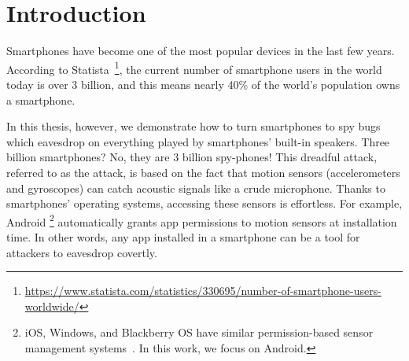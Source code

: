 \section{Introduction}\label{sec:intro}

Smartphones have become one of the most popular devices in the last few years. According to Statista~\footnote{\url{https://www.statista.com/statistics/330695/number-of-smartphone-users-worldwide/}}, the current number of smartphone users in the world today is over 3 billion, and this means nearly 40\% of the world’s population owns a smartphone. 

In this thesis, however, we demonstrate how to turn smartphones to spy bugs which eavesdrop on everything played by smartphones' built-in speakers. Three billion smartphones? No, they are 3 billion spy-phones!
%
This dreadful attack, referred to as the \textit{{\attackName}} attack, is based on the fact that motion sensors (accelerometers and gyroscopes) can catch acoustic signals like a crude microphone. 
%
%
Thanks to smartphones' operating systems, accessing these sensors is effortless. 
For example,  Android
\footnote{\scriptsize iOS, Windows, and Blackberry OS have similar permission-based sensor management systems~\cite{sikder20176thsense}. In this work, we focus on Android.} 
automatically grants app permissions to motion sensors at installation time. In other words, any app installed in a smartphone can be a tool for attackers to eavesdrop covertly.

